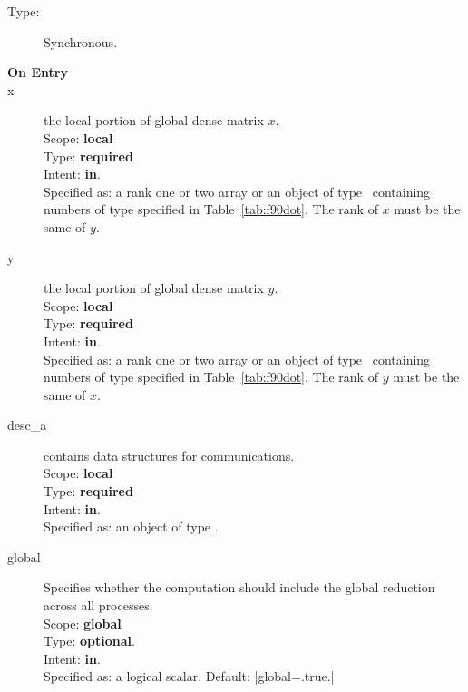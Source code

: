\begin{description}
\item[Type:] Synchronous.
\item[\bf On Entry]
\item[x] the local portion of global dense matrix
$x$.\\
Scope: {\bf local} \\
Type: {\bf required} \\
Intent: {\bf in}.\\
Specified as:  a rank one or two array or an object of type \vdata\
containing numbers of type specified in
Table~\ref{tab:f90dot}. The rank of $x$ must be the same of $y$.
\item[y] the local portion of global dense matrix
$y$. \\
Scope: {\bf local} \\
Type: {\bf required} \\
Intent: {\bf in}.\\
Specified as:  a rank one or two array or an object of type \vdata\
containing numbers of type specified in
Table~\ref{tab:f90dot}. The rank of $y$ must be the same of $x$.
\item[desc\_a] contains data structures for communications.\\
Scope: {\bf local} \\
Type: {\bf required}\\
Intent: {\bf in}.\\
Specified as: an object of type \descdata.
\item[global]  Specifies whether the computation should include the
  global reduction across all processes.\\
Scope: {\bf global} \\
Type: {\bf optional}.\\
Intent: {\bf in}.\\
Specified as: a logical scalar.
Default: \fortinline|global=.true.|\\


\end{description}
